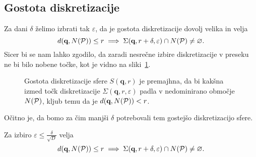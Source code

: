 \subsection{Gostota diskretizacije}
Za dani $\delta$ želimo izbrati tak $\varepsilon$, da je gostota diskretizacije dovolj velika in velja
\[
d(\textbf{q}, N(\P)) \leq r \implies \Sigma(\textbf{q}, r + \delta, \varepsilon) \cap N(\P) \neq \varnothing.
\]
Sicer bi se nam lahko zgodilo, da zaradi nesrečne izbire diskretizacije v preseku ne bi bilo nobene točke, kot je vidno na sliki~\ref{fig:determining-epsilon3}.
\begin{figure}[ht]
  \centering
  
  \caption{Gostota diskretizacije sfere $S(\textbf{q}, r)$ je premajhna, da bi kakšna izmed točk diskretizacije $\Sigma(\textbf{q}, r, \varepsilon)$ padla v nedominirano območje $N(\P)$, kljub temu da je $d(\textbf{q}, N(\P)) < r$.}
  \label{fig:determining-epsilon3}
\end{figure}
Očitno je, da bomo za čim manjši $\delta$ potrebovali tem gostejšo diskretizacijo sfere. 
\begin{trditev}
\label{trditev:dokaz_pravilnosti}
Za izbiro $\varepsilon \leq \frac{\delta}{\sqrt{D}}$ velja
\[
d(\textbf{q}, N(\P)) \leq r \implies \Sigma(\textbf{q}, r + \delta, \varepsilon) \cap N(\P) \neq \varnothing.
\]
\end{trditev}
